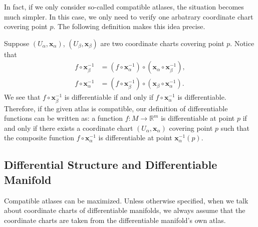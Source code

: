 \documentclass{report}
\begin{document}
In fact, if we only consider so-called compatible atlases, the situation becomes much simpler. In this case, we only need to verify one arbatrary 
coordinate chart covering point $p$. The following definition makes this idea precise.


Suppose $(U_\alpha,\mathbf{x}_\alpha)$, $(U_\beta,\mathbf{x}_\beta)$ are two coordinate charts covering point $p$. Notice that
$$
\begin{aligned}
f\circ \mathbf{x}_\beta^{-1} &= (f\circ \mathbf{x}^{-1}_\alpha)\circ(\mathbf{x}_\alpha\circ \mathbf{x}^{-1}_{\beta}),\\
f\circ \mathbf{x}_\alpha^{-1} &= (f\circ \mathbf{x}^{-1}_\beta)\circ(\mathbf{x}_\beta\circ \mathbf{x}^{-1}_{\alpha}).
\end{aligned}
$$
We see that $f \circ \mathbf{x}_\beta^{-1}$ is differentiable if and only if $f \circ \mathbf{x}_\alpha^{-1}$ is differentiable. Therefore, if the given atlas is compatible, our definition of differentiable functions can be written as: a function $f: M \to \mathbb{R}^m$ is differentiable at point $p$ if and only if there exists a coordinate chart $(U_\alpha, \mathbf{x}_\alpha)$ covering point $p$ such that the composite function $f\circ \mathbf{x}_\alpha^{-1}$ is differentiable at point $\mathbf{x}^{-1}_\alpha(p)$.

\subsection{Differential Structure and Differentiable Manifold}
Compatible atlases can be maximized.
 Unless otherwise specified, when we talk about coordinate charts of differentiable manifolds, we always assume that the coordinate charts are taken from the differentiable manifold's own atlas.
\end{document}
